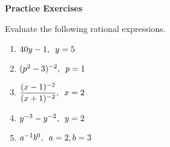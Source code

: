 \textbf{Practice Exercises}

\vspce

Evaluate the following  rational expressions.

\begin{enumerate}[label = \arabic*. ]

\item \hspce $40y-1,\hspace{0.5em} y=5$
\item \hspce $(p^{2} - 3)^{-2},\hspace{0.5em} p=1$
\item \hspce $\displaystyle \frac{(x-1)^{-2}}{(x+1)^{-2}},\hspace{0.5em} x=2$
\item \hspce $y^{-3}-y^{-2},\hspace{0.5em} y=2$
\item \hspce $a^{-1}b^{0},\hspace{0.5em} a=2, b=3$

\end{enumerate}